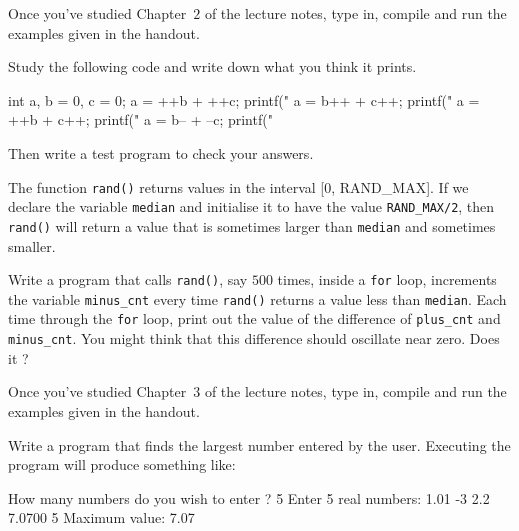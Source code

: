 \begin{exercise}
Once you've studied Chapter~$2$ of the lecture notes, type in, compile and run
the examples given in the handout.
\end{exercise}

Study the following code and write down what you think it prints.
\begin{codesnippet}
int a, b = 0, c = 0;
a = ++b + ++c;
printf("%
a = b++ + c++;
printf("%
a = ++b + c++;
printf("%
a = b-- + --c;
printf("%
\end{codesnippet}
\begin{exercise}
Then write a test program to check your answers.
\end{exercise}

The function \verb^rand()^ returns values in the interval [0, RAND\_MAX].
If we declare the variable \verb^median^ and initialise it to have the
value \verb^RAND_MAX/2^, then \verb^rand()^ will return a value
that is sometimes larger than \verb^median^ and sometimes smaller.

\begin{exercise}
Write a program that calls \verb^rand()^, say $500$ times,
inside a \verb^for^ loop, increments the variable \verb^minus_cnt^
every time \verb^rand()^ returns a value less than \verb^median^.
Each time through the \verb^for^ loop, print out the value of the difference
of \verb^plus_cnt^ and \verb^minus_cnt^.
You might think that this difference should oscillate near zero. Does it ?
\end{exercise}

\begin{exercise}
Once you've studied Chapter~$3$ of the lecture notes, type in, compile and run
the examples given in the handout.
\end{exercise}

\begin{exercise}
Write a program that finds the largest number entered by the user.
Executing the program will produce something like:
\begin{codesnippet}
How many numbers do you wish to enter ? 5
Enter 5 real numbers: 1.01 -3 2.2 7.0700 5
Maximum value: 7.07
\end{codesnippet}
\end{exercise}

